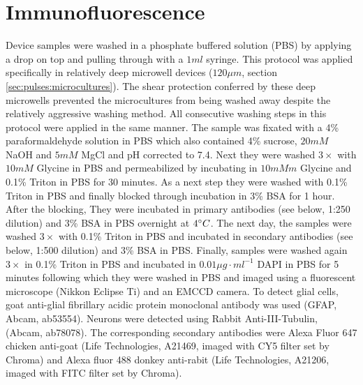  \section{Immunofluorescence}
Device samples were washed in a phosphate buffered solution (PBS) by applying a drop on top and pulling through with a \(1ml\) syringe. This protocol was applied specifically in relatively deep microwell devices (\(120\mu m\), section \ref{sec:pulses:microcultures}). The shear protection conferred by these deep microwells prevented the microcultures from being washed away despite the relatively aggressive washing method. All consecutive washing steps in this protocol were applied in the same manner. The sample was fixated with a 4\% paraformaldehyde solution in PBS which also contained 4\% sucrose, \(20mM\) NaOH and \(5mM\) MgCl and pH corrected to 7.4. Next they were washed \(3\times\) with \(10mM\) Glycine in PBS and permeabilized by incubating in \(10mMm\) Glycine and 0.1\% Triton in PBS for 30 minutes.  As a next step they were washed with 0.1\% Triton in PBS and finally blocked through incubation in 3\% BSA for 1 hour. After the blocking, They were  incubated in primary antibodies (see below, 1:250 dilution) and 3\% BSA in PBS overnight at \(4\degree C\). The next day, the samples were washed \(3\times\) with 0.1\% Triton in PBS and incubated in secondary antibodies (see below, 1:500 dilution) and 3\% BSA in PBS. Finally, samples were washed again \(3\times\) in 0.1\% Triton in PBS and incubated in \(0.01 \mu g\cdot ml^{-1}\) DAPI in PBS for 5 minutes following which they were washed in PBS and imaged using a fluorescent microscope (Nikkon Eclipse Ti) and an EMCCD camera. To detect glial cells, goat anti-glial fibrillary acidic protein monoclonal antibody was used (GFAP, Abcam, ab53554). Neurons were detected using Rabbit Anti-\textbeta III-Tubulin, (Abcam, ab78078). The corresponding secondary antibodies were Alexa Fluor 647 chicken anti-goat (Life Technologies, A21469, imaged with CY5 filter set by Chroma) and Alexa fluor 488 donkey anti-rabit (Life Technologies, A21206, imaged with FITC filter set by Chroma).



